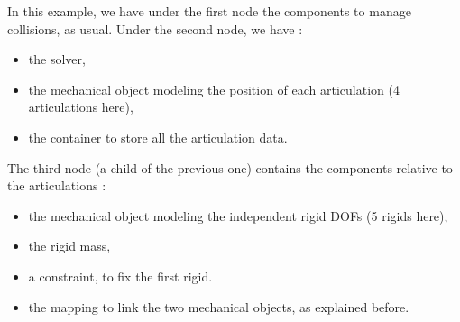 In this example, we have under the first node the components to manage collisions, as usual.
Under the second node, we have :
\begin{itemize}
	\item the solver,
	\item the mechanical object modeling the position of each articulation (4 articulations here),
	\item the container to store all the articulation data.
\end{itemize}

The third node (a child of the previous one) contains the components relative to the articulations :
\begin{itemize}
	\item the mechanical object modeling the independent rigid DOFs (5 rigids here),	
	\item the rigid mass,
	\item a constraint, to fix the first rigid.
	\item the mapping to link the two mechanical objects, as explained before.
\end{itemize}
